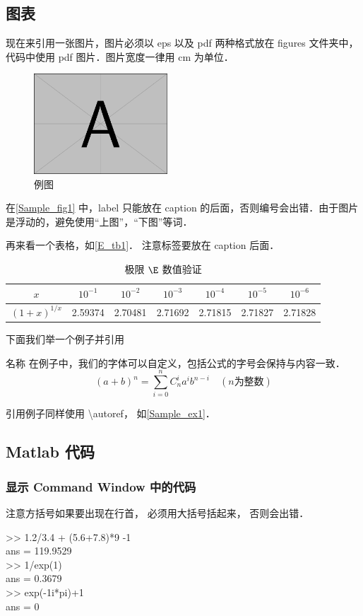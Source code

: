 \subsection{图表}

现在来引用一张图片，图片必须以 eps 以及 pdf 两种格式放在 figures 文件夹中，代码中使用 pdf 图片．图片宽度一律用 cm 为单位．
\begin{figure}[ht]
\centering
\includegraphics[width=5cm]{./figures/Sample.pdf}
\caption{例图} \label{Sample_fig1}
\end{figure}
在\autoref{Sample_fig1} 中，label 只能放在 caption 的后面，否则编号会出错．由于图片是浮动的，避免使用“上图”，“下图”等词．

再来看一个表格，如\autoref{E_tb1}． 注意标签要放在 caption 后面．
\begin{table}[ht]
\centering
\caption{极限 $\E$ 数值验证}\label{E_tab1}
\begin{tabular}{|c|c|c|c|c|c|c|}
\hline
$x$ & ${10^{ - 1}}$ & ${10^{ - 2}}$ & ${10^{ - 3}}$ & ${10^{ - 4}}$ & ${10^{ - 5}}$ & ${10^{ - 6}}$ \\
\hline
$(1 + x)^{1/x}$ & 2.59374 & 2.70481 & 2.71692 & 2.71815 & 2.71827 & 2.71828 \\
\hline
\end{tabular}
\end{table}

下面我们举一个例子并引用

\begin{exam}{名称}\label{Sample_ex1}
在例子中，我们的字体可以自定义，包括公式的字号会保持与内容一致．
\begin{equation}
(a+b)^n = \sum_{i=0}^n C_n^i a^i b^{n-i} \quad (n\text{为整数})
\end{equation}
\end{exam}
引用例子同样使用 \textbackslash autoref， 如\autoref{Sample_ex1}． 

\subsection{Matlab 代码}

\subsubsection{显示  Command Window 中的代码}
注意方括号如果要出现在行首， 必须用大括号括起来， 否则会出错．
\begin{Command}
>> 1.2/3.4 + (5.6+7.8)*9 -1 \\
ans = 119.9529 \\
>> 1/exp(1) \\
ans = 0.3679 \\
>> exp(-1i*pi)+1 \\
ans = 0
\end{Command}

